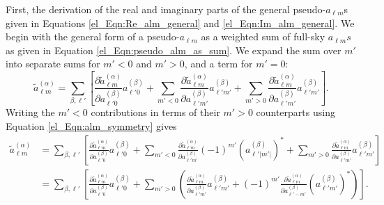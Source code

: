 First,
the derivation of the real and imaginary parts of the general pseudo-$a_{\ell m}$s given in Equations \eqref{el_Eqn:Re_alm_general} and \eqref{el_Eqn:Im_alm_general}. We begin with the general form of a pseudo-$a_{\ell m}$ as a weighted sum of full-sky $a_{\ell m}s$ as given in Equation
\eqref{el_Eqn:pseudo_alm_as_sum}. We expand the sum over $m'$ into separate sums for $m' < 0$ and $m' > 0$, and a term for $m' = 0$:
\begin{equation}
\widetilde{a}_{\ell m}^{ \left( \alpha \right) } =
\sum_{\beta, \ell'} \left[
\frac{\partial \widetilde{a}_{\ell m}^{ \left( \alpha \right) }}
{\partial a_{\ell' 0}^{ \left( \beta \right) }}
a_{\ell' 0}^{ \left( \beta \right) }
+ \sum_{m' < 0}
\frac{\partial \widetilde{a}_{\ell m}^{ \left( \alpha \right) }}
{\partial a_{\ell' m'}^{ \left( \beta \right) }}
a_{\ell' m'}^{ \left( \beta \right) }
+ \sum_{m' > 0}
\frac{\partial \widetilde{a}_{\ell m}^{ \left( \alpha \right) }}
{\partial a_{\ell' m'}^{ \left( \beta \right) }}
a_{\ell' m'}^{ \left( \beta \right) }
\right].
\end{equation}
Writing the $m' < 0$ contributions in terms of their $m' > 0$ counterparts using Equation
\eqref{el_Eqn:alm_symmetry}
gives
\begin{equation}
\begin{split}
\widetilde{a}_{\ell m}^{ \left( \alpha \right) } &=
\sum_{\beta, \ell'} \left[
\frac{\partial \widetilde{a}_{\ell m}^{ \left( \alpha \right) }}
{\partial a_{\ell' 0}^{ \left( \beta \right) }}
a_{\ell' 0}^{ \left( \beta \right) }
+ \sum_{m' < 0}
\frac{\partial \widetilde{a}_{\ell m}^{ \left( \alpha \right) }}
{\partial a_{\ell' m'}^{ \left( \beta \right) }}
\left( -1 \right)^{m'}
\left( a_{\ell' \lvert m' \rvert}^{\left( \beta \right)} \right)^*
+ \sum_{m' > 0}
\frac{\partial \widetilde{a}_{\ell m}^{ \left( \alpha \right) }}
{\partial a_{\ell' m'}^{ \left( \beta \right) }}
a_{\ell' m'}^{ \left( \beta \right) }
\right] \\
&= \sum_{\beta, \ell'} \left[
\frac{\partial \widetilde{a}_{\ell m}^{ \left( \alpha \right) }}
{\partial a_{\ell' 0}^{ \left( \beta \right) }}
a_{\ell' 0}^{ \left( \beta \right) }
+ \sum_{m' > 0} \left(
\frac{\partial \widetilde{a}_{\ell m}^{ \left( \alpha \right) }}
{\partial a_{\ell' m'}^{ \left( \beta \right) }}
a_{\ell' m'}^{ \left( \beta \right) }
+ \left( -1 \right)^{m'}
\frac{\partial \widetilde{a}_{\ell m}^{ \left( \alpha \right) }}
{\partial a_{\ell' -m'}^{ \left( \beta \right) }}
\left( a_{\ell' m'}^{ \left( \beta \right) } \right)^*
\right)
\right].
\end{split}
\end{equation}

